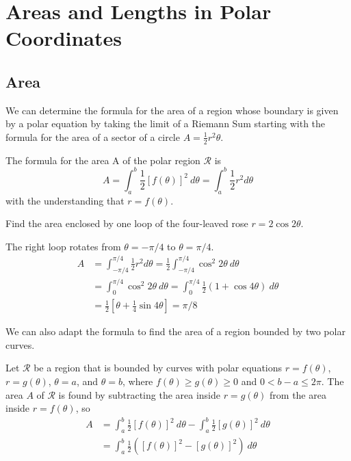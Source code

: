 \section{Areas and Lengths in Polar Coordinates}
  \subsection*{Area}
    We can determine the formula for the area of a region whose boundary is given by a polar equation by taking the limit of a Riemann Sum starting with the formula for the area of a sector of a circle $A=\frac{1}{2}r^2 \theta$.
    \begin{definition}
      The formula for the area A of the polar region $\mathcal{R}$ is
      $$A=\int_{a}^{b}\frac{1}{2}[f(\theta)]^2\ d\theta = \int_{a}^{b}\frac{1}{2}r^2 d\theta$$
      with the understanding that $r=f(\theta)$.
    \end{definition}
    \begin{example}
      Find the area enclosed by one loop of the four-leaved rose $r=2\cos2\theta$.
    \end{example}
    \begin{solution}
      The right loop rotates from $\theta=-\pi/4$ to $\theta=\pi/4$.
      \begin{align*}
        A &= \int_{-\pi/4}^{\pi/4}\frac{1}{2}r^2 d\theta = \frac{1}{2}\int_{-\pi/4}^{\pi/4}\cos^2 2\theta\ d\theta \\
          &= \int_{0}^{\pi/4}\cos^2 2\theta\ d\theta = \int_{0}^{\pi/4}\frac{1}{2}(1+\cos4\theta)\ d\theta \\
          &= \frac{1}{2}[\theta+\frac{1}{4}\sin4\theta] = \pi/8
      \end{align*}
    \end{solution}
    We can also adapt the formula to find the area of a region bounded by two polar curves.
    \begin{definition}
      Let $\mathcal{R}$ be a region that is bounded by curves with polar equations $r=f(\theta)$, $r=g(\theta)$, $\theta=a$, and $\theta=b$, where $f(\theta) \geq g(\theta) \geq 0$ and $0 < b-a \leq 2\pi$. The area $A$ of $\mathcal{R}$ is found by subtracting the area inside $r=g(\theta)$ from the area inside $r=f(\theta)$, so
      \begin{align*}
        A &= \int_{a}^{b}\frac{1}{2}[f(\theta)]^2\ d\theta - \int_{a}^{b}\frac{1}{2}[g(\theta)]^2\ d\theta \\
          &= \int_{a}^{b}\frac{1}{2}([f(\theta)]^2 - [g(\theta)]^2)\ d\theta
      \end{align*}
    \end{definition}
